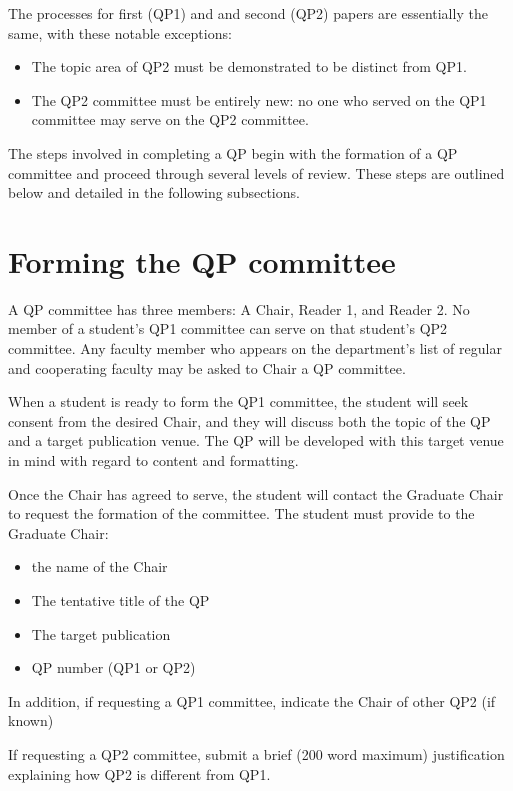 \documentclass[
]{book}
\providecommand{\tightlist}{%
  \setlength{\itemsep}{0pt}\setlength{\parskip}{0pt}}
\begin{document}
The processes for first (QP1) and and second (QP2) papers are essentially the same, with these notable exceptions:

\begin{itemize}
\tightlist
\item
  The topic area of QP2 must be demonstrated to be distinct from QP1.
\item
  The QP2 committee must be entirely new: no one who served on the QP1 committee may serve on the QP2 committee.
\end{itemize}

The steps involved in completing a QP begin with the formation of a QP committee and proceed through several levels of review. These steps are outlined below and detailed in the following subsections.

\section{Forming the QP committee}\label{QP_committee}

A QP committee has three members: A Chair, Reader 1, and Reader 2. No member of a student's QP1 committee can serve on that student's QP2 committee. Any faculty member who appears on the department's list of regular and cooperating faculty may be asked to Chair a QP committee.

When a student is ready to form the QP1 committee, the student will seek consent from the desired Chair, and they will discuss both the topic of the QP and a target publication venue. The QP will be developed with this target venue in mind with regard to content and formatting.

Once the Chair has agreed to serve, the student will contact the Graduate Chair to request the formation of the committee. The student must provide to the Graduate Chair:

\begin{itemize}
\tightlist
\item
  the name of the Chair
\item
  The tentative title of the QP
\item
  The target publication
\item
  QP number (QP1 or QP2)
\end{itemize}

In addition, if requesting a QP1 committee, indicate the Chair of other QP2 (if known)

If requesting a QP2 committee, submit a brief (200 word maximum) justification explaining how QP2 is different from QP1.
\end{document}
